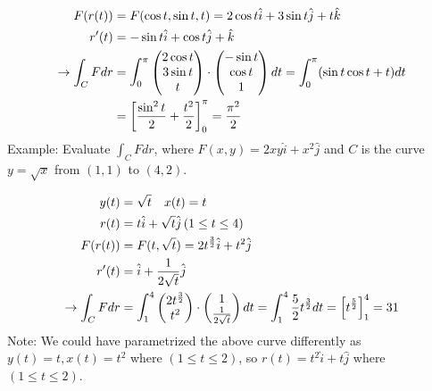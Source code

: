 \documentclass{article}
\newcommand{\n}{\leavevmode \newline} %
\numberwithin{equation}{subsection} %
\begin{document}
\begin{equation}
    \begin{split}
        F(r(t)) &= F(\cos{t},\sin{t},t) = 2\cos{t}\hat{i}+3\sin{t}\hat{j}+t\hat{k} \\
        r'(t) &= -\sin{t}\hat{i}+\cos{t}\hat{j}+\hat{k}
        \\
        \to\int_C F dr &= \mathlarger{\int}_0^\pi 
        \begin{pmatrix}
            2\cos{t} \\ 3\sin{t} \\ t
        \end{pmatrix}
        \cdot
        \begin{pmatrix}
            -\sin{t} \\ \cos{t} \\ 1
        \end{pmatrix}
        dt = 
        \int_0^\pi (\sin{t}\cos{t} + t) dt
        \\
        &= \left[ \frac{\sin^2{t}}{2} + \frac{t^2}{2} \right]_0^\pi = \frac{\pi^2}{2}
    \end{split}
\end{equation}
\n
Example: Evaluate $\int_C Fdr$, where $F(x,y)=2xy\hat{i}+x^2\hat{j}$ and $C$ is the curve $y=\sqrt{x}$ from $(1,1)$ to $(4,2)$.

\begin{equation}
    \begin{split}
        y(t) &= \sqrt{t} \quad x(t) = t
        \\
        r(t) &= t\hat{i}+\sqrt{t}\hat{j}\, (1 \leq t \leq 4)
        \\
        F(r(t)) &= F(t,\sqrt{t}) = 2t^{\frac{3}{2}}\hat{i}+t^2\hat{j}\\
        r'(t) &= \hat{i}+\frac{1}{2\sqrt{t}}\hat{j}
        \\
        \to\int_C Fdr &= \mathlarger{\int}_1^4
        \begin{pmatrix}
            2t^{\frac{3}{2}} \\ t^2
        \end{pmatrix}
        \cdot
        \begin{pmatrix}
            1 \\ \frac{1}{2\sqrt{t}}
        \end{pmatrix}
        dt = \int_1^4 \frac{5}{2} t^{\frac{3}{2}}dt = \left[ t^{\frac{5}{2}} \right]_1^4 = 31
    \end{split}
\end{equation} \n
Note: We could have parametrized the above curve differently as $y(t)=t,x(t)=t^2$ where $(1 \leq t \leq 2)$, so $r(t)=t^2\hat{i}+t\hat{j}$ where $(1\leq t \leq 2)$.
\end{document}
